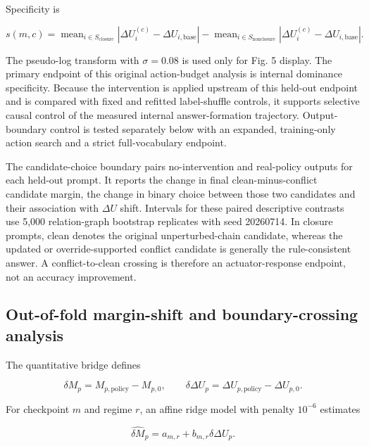 \documentclass[10pt]{article}
\begin{document}
Specificity is

\begin{equation*}
s(m,c)=\operatorname{mean}_{i\in S_{\mathrm{closure}}}|\Delta U_i^{(c)}-\Delta U_{i,\mathrm{base}}|-\operatorname{mean}_{i\in S_{\mathrm{nonclosure}}}|\Delta U_i^{(c)}-\Delta U_{i,\mathrm{base}}|.
\end{equation*}

The pseudo-log transform with \(\sigma=0.08\) is used only for Fig. 5 display. The primary endpoint of this original action-budget analysis is internal dominance specificity. Because the intervention is applied upstream of this held-out endpoint and is compared with fixed and refitted label-shuffle controls, it supports selective causal control of the measured internal answer-formation trajectory. Output-boundary control is tested separately below with an expanded, training-only action search and a strict full-vocabulary endpoint.

The candidate-choice boundary pairs no-intervention and real-policy outputs for each held-out prompt. It reports the change in final clean-minus-conflict candidate margin, the change in binary choice between those two candidates and their association with \(\Delta U\) shift. Intervals for these paired descriptive contrasts use 5,000 relation-graph bootstrap replicates with seed 20260714. In closure prompts, clean denotes the original unperturbed-chain candidate, whereas the updated or override-supported conflict candidate is generally the rule-consistent answer. A conflict-to-clean crossing is therefore an actuator-response endpoint, not an accuracy improvement.

\subsection*{Out-of-fold margin-shift and boundary-crossing analysis}

The quantitative bridge defines

\begin{equation*}
\delta M_p=M_{p,\mathrm{policy}}-M_{p,0},\qquad
\delta\Delta U_p=\Delta U_{p,\mathrm{policy}}-\Delta U_{p,0}.
\end{equation*}

For checkpoint \(m\) and regime \(r\), an affine ridge model with penalty \(10^{-6}\) estimates

\begin{equation*}
\widehat{\delta M}_p=a_{m,r}+b_{m,r}\delta\Delta U_p.
\end{equation*}
\end{document}
